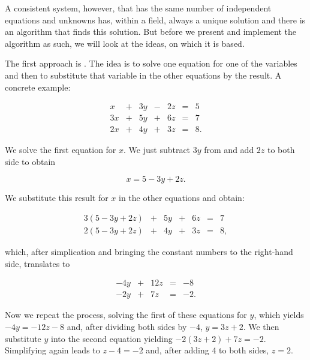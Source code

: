 \documentclass[tikz]{scrreprt}
\begin{document}
A consistent system, however, that has the same number
of independent equations and unknowns has,
within a field, always a unique
solution and there is an algorithm that finds
this solution.
But before we present and implement the algorithm as such,
we will look at the ideas, on which it is based.

The first approach is . The idea is
to solve one equation for one of the variables and then
to substitute that variable in the other equations by
the result. A concrete example:

\begin{equation}
\begin{array}{rcrcrcr}
 x & + & 3y & - & 2z & = &  5\\
3x & + & 5y & + & 6z & = &  7\\
2x & + & 4y & + & 3z & = &  8.
\end{array}
\end{equation}

We solve the first equation for $x$.
We just subtract $3y$ from and add $2z$ to both side
to obtain

\begin{equation}
x = 5 - 3y + 2z.
\end{equation}

We substitute this result for $x$ in the other equations
and obtain:

\begin{equation}
\begin{array}{rcrcrcr}
3(5-3y+2z) & + & 5y & + & 6z & = &  7\\
2(5-3y+2z) & + & 4y & + & 3z & = &  8,
\end{array}
\end{equation}

which, after simplication and bringing the constant
numbers to the right-hand side, translates to

\begin{equation}
\begin{array}{rcrcr}
-4y & + & 12z & = & -8\\
-2y & + & 7z & = &  -2.
\end{array}
\end{equation}

Now we repeat the process, solving the first of these equations
for $y$, which yields $-4y = -12z-8$ and, after dividing
both sides by $-4$, $y=3z+2$. We then substitute $y$
into the second equation yielding $-2(3z+2) + 7z = -2$.
Simplifying again leads to $z-4=-2$ and, after adding 4 to both sides,
$z=2$.
\end{document}
